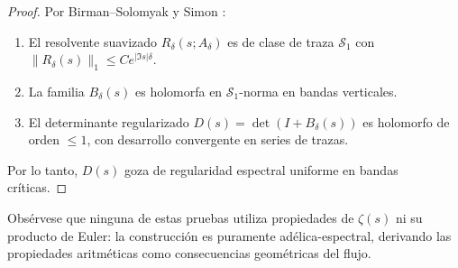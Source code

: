 \begin{proof}
Por Birman--Solomyak \cite{BirmanSolomyak1977} y Simon \cite{SimonTraceIdeals2005}:
\begin{enumerate}
\item El resolvente suavizado $R_\delta(s; A_\delta)$ es de clase de traza $\mathcal{S}_1$
   con $\|R_\delta(s)\|_1 \le C e^{|\Im s|\delta}$.
\item La familia $B_\delta(s)$ es holomorfa en $\mathcal{S}_1$-norma en bandas verticales.
\item El determinante regularizado $D(s) = \det(I+B_\delta(s))$ es holomorfo de orden $\le 1$,
   con desarrollo convergente en series de trazas.
\end{enumerate}
Por lo tanto, $D(s)$ goza de regularidad espectral uniforme en bandas críticas.
\end{proof}

\begin{remark}[No circularidad]
Obsérvese que ninguna de estas pruebas utiliza propiedades de $\zeta(s)$ ni su producto de Euler:
la construcción es puramente adélica-espectral, derivando las propiedades aritméticas
como consecuencias geométricas del flujo.
\end{remark}
